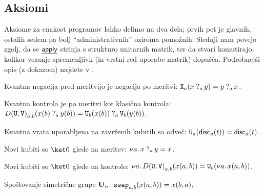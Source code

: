 \documentclass[a4paper,slovene]{article}
\begin{document}
\subsection{Aksiomi}

Aksiome za enakost programov lahko delimo na dva dela; prvih pet je glavnih, ostalih sedem pa bolj "`administrativnih"' oziroma pomožnih. Slednji nam povejo zgolj, da se \( \eff{apply} \)
strinja s strukturo unitarnih matrik, ter da stvari komutirajo, kolikor vezanje spremenljivk (in vrstni red uporabe matrik) dopušča. Podrobnejši opis (z dokazom) najdete v \cite{algeff-lin-qpl}.


\begin{axiom}{Kvantna negacija pred meritvijo je negacija po meritvi:}\label{ax-1}
    \( \apply{X}{a}{\measureraw{a}{x}{y}} = \measureraw{a}{y}{x} \).
\end{axiom}

\begin{axiom}{Kvantna kontrola je po meritvi kot klasična kontrola:}\label{ax-2}
    \( \applyd{U, V}{a,b}{\measureraw{a}{x(b)}{y(b)}}
        = \measureraw{a}{\apply{U}{b}{x(b)}}{\apply{V}{b}{y(b)}} \).
\end{axiom}

\begin{axiom}{Kvantna vrata uporabljena na zavrženih kubitih so odveč:}\label{ax-3}
    \( \apply{U}{a}{\discard{a}{t}} = \discard{a}{t} \).
\end{axiom}

\begin{axiom}{Novi kubiti so \( \ket0 \) glede na meritev:}\label{ax-4}
    \( \new{a}{\measureraw{a}{x}{y}} = x \).
\end{axiom}

\begin{axiom}{Novi kubiti so \( \ket0 \) glede na kontrolo:}\label{ax-5}
    \( \new{a}{\applyd{U,V}{a,b}{x{\p{a,b}}}} = \apply{U}{b}{\new{a}{x{\p{a,b}}}} \).
\end{axiom}

\begin{axiom}{Spoštovanje simetrične grupe \( \U[n] \):}\label{ax-6}
    \( \apply{swap}{a,b}{x{\p{a,b}}} = x{\p{b,a}} \),
\end{axiom}
\end{document}
